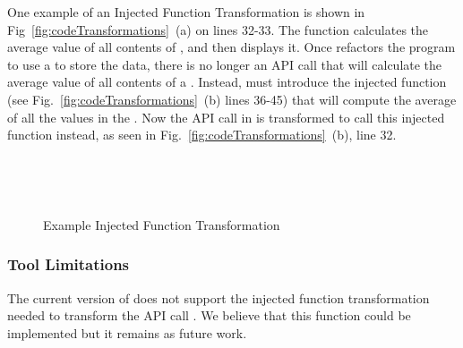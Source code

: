 \documentclass[preprint]{sigplanconf}
\begin{document}
One example of an Injected Function Transformation is shown in Fig~\ref{fig:codeTransformations}~(a) on lines 32-33.
The function  calculates the average value of all contents of , and then displays it. 
Once \tool refactors the program to use a \CDT to store the data, there is no longer an API call that will calculate the average value 
of all contents of a \CDT. Instead, \tool must introduce the injected function  (see Fig.~\ref{fig:codeTransformations}~(b) lines 36-45) that will compute the average of all the values in the .  
Now the API call in  is transformed to call this  injected function instead, as seen in Fig.~\ref{fig:codeTransformations}~(b), line 32.

 \\


\begin{figure}
   \centering
    \mbox{
      \hspace{0.2in}
    }
    \caption{Example Injected Function Transformation}
    \label{fig:MaxCustomTransformationTransformations}
\end{figure}


\subsubsection{Tool Limitations}
The current version of \tool does not support the injected function transformation needed to transform the API call .  We believe that this function could be implemented but it remains as future work. 
\end{document}
